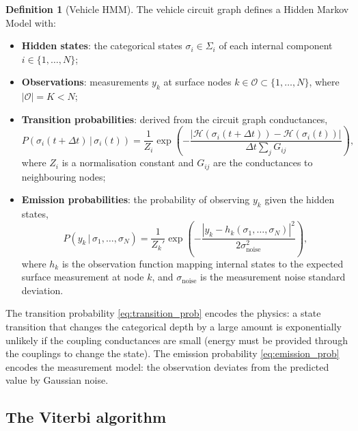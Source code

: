 \documentclass[twocolumn,10pt,a4paper]{article}
\theoremstyle{definition}
\newtheorem{definition}[theorem]{Definition}
\theoremstyle{remark}
\begin{document}
\begin{definition}[Vehicle HMM]\label{def:vehicle_hmm}
The vehicle circuit graph defines a Hidden Markov Model \citep{Rabiner1989} with:
\begin{itemize}
\item \textbf{Hidden states}: the categorical states $\sigma_i \in \Sigma_i$ of each internal component $i \in \{1, \ldots, N\}$;
\item \textbf{Observations}: measurements $y_k$ at surface nodes $k \in \mathcal{O} \subset \{1, \ldots, N\}$, where $|\mathcal{O}| = K < N$;
\item \textbf{Transition probabilities}: derived from the circuit graph conductances,
\begin{equation}\label{eq:transition_prob}
P(\sigma_i(t+\Delta t) \,|\, \sigma_i(t)) = \frac{1}{Z_i} \exp\left(-\frac{|\mathcal{H}(\sigma_i(t+\Delta t)) - \mathcal{H}(\sigma_i(t))|}{\Delta t \sum_{j} G_{ij}}\right),
\end{equation}
where $Z_i$ is a normalisation constant and $G_{ij}$ are the conductances to neighbouring nodes;
\item \textbf{Emission probabilities}: the probability of observing $y_k$ given the hidden states,
\begin{equation}\label{eq:emission_prob}
P(y_k \,|\, \sigma_1, \ldots, \sigma_N) = \frac{1}{Z_k'} \exp\left(-\frac{|y_k - h_k(\sigma_1, \ldots, \sigma_N)|^2}{2\sigma_{\mathrm{noise}}^2}\right),
\end{equation}
where $h_k$ is the observation function mapping internal states to the expected surface measurement at node $k$, and $\sigma_{\mathrm{noise}}$ is the measurement noise standard deviation.
\end{itemize}
\end{definition}

The transition probability \eqref{eq:transition_prob} encodes the physics: a state transition that changes the categorical depth by a large amount is exponentially unlikely if the coupling conductances are small (energy must be provided through the couplings to change the state). The emission probability \eqref{eq:emission_prob} encodes the measurement model: the observation deviates from the predicted value by Gaussian noise.

\subsection{The Viterbi algorithm}
\end{document}
